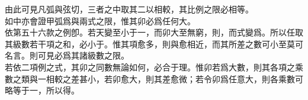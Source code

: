 \begin{enumerate} [label={第\chinese*款},nolistsep]
	由此可見凡弧與弦切，三者之中取其二以相較，其比例之限必相等。\\
	如中亦會證甲弧爲\CJKmove 與\CJKmove 兩式之限，惟其卯必爲任何大。\\
	依第五十六款之例\CJKmove 卽\CJKmove。若天變至小于一，而卯大至無窮，則\CJKmove ，而式變爲\CJKmove。所以任取其級數若干項之和，必小于\CJKmove。惟其項愈多，則與\CJKmove 愈相近，而其所差之數可小至莫可名言。則可見\CJKmove 必爲其諸級數之限。\\
	若依二項例之式\CJKmove ，其卯之同數無論如何，必合于理。惟卯若爲大數，則其各項之乘數\CJKmove 之類與一相較之差甚小，若卯愈大，則其差愈微；若令卯爲任意大，則各乘數可略等于一，所以得\CJKmove {}。\\

\end{enumerate}
